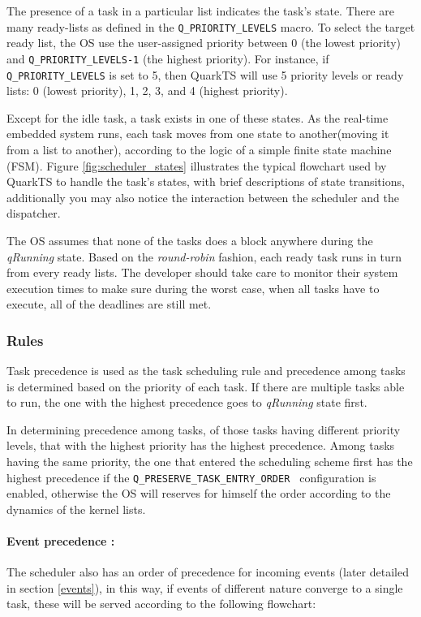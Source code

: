 The presence of a task in a particular list indicates the task's state. 
There are many ready-lists as defined in the \lstinline{Q_PRIORITY_LEVELS} macro.
To select the target ready list, the OS use the user-assigned priority between 0 (the lowest priority) and \lstinline{Q_PRIORITY_LEVELS-1} (the highest priority). For instance, if \lstinline{Q_PRIORITY_LEVELS} is set to 5, then QuarkTS will use 5 priority levels or ready lists: 0 (lowest priority), 1, 2, 3, and 4 (highest priority). 



Except for the idle task, a task exists in one of these states. As the real-time embedded system runs, each task moves from one state to another(moving it from a list to another), according to the logic of a simple finite state machine (FSM). Figure \ref{fig:scheduler_states} illustrates the typical flowchart used by QuarkTS to handle the task's states, with brief descriptions of state transitions, additionally you may also notice the interaction between the scheduler and the dispatcher.

The OS assumes that none of the tasks does a block anywhere during the \textit{qRunning} state. Based on the \textit{round-robin} fashion, each ready task runs in turn from every ready lists. The developer should take care to monitor their system execution times to make sure during the worst case, when all tasks have to execute, all of the deadlines are still met.


\subsubsection{Rules}
Task precedence is used as the task scheduling rule and precedence among tasks is determined based on the priority of each task. If there are multiple tasks able to run, the one with the highest precedence goes to \textit{qRunning} state first. 

In determining precedence among tasks, of those tasks having different priority levels, that with the highest priority has the highest precedence. Among tasks having the same priority, the one that entered the scheduling scheme first has the highest precedence if the \lstinline{Q_PRESERVE_TASK_ENTRY_ORDER } configuration is enabled, otherwise the OS will reserves for himself the order according to the dynamics of the kernel lists.

\paragraph{Event precedence :}
The scheduler also has an order of precedence for incoming events (later detailed in section \ref{events}), in this way, if events of different nature converge to a single task, these will be served according to the following flowchart:

